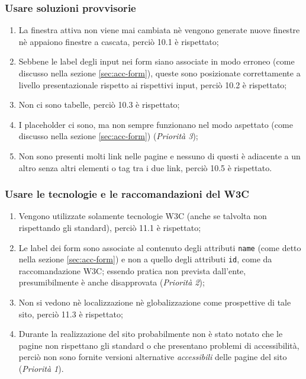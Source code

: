 \subsubsection{Usare soluzioni provvisorie}
\begin{enumerate}
\item La finestra attiva non viene mai cambiata nè vengono generate nuove
finestre nè appaiono finestre a cascata, perciò 10.1 è rispettato;
\item Sebbene le label degli input nei form siano associate in modo erroneo
(come discusso nella sezione \ref{sec:acc-form}), queste sono posizionate
correttamente a livello presentazionale rispetto ai rispettivi input, perciò
10.2 è rispettato;
\item Non ci sono tabelle, perciò 10.3 è rispettato;
\item I placeholder ci sono, ma non sempre funzionano nel modo aspettato (come
discusso nella sezione \ref{sec:acc-form}) (\textit{Priorità 3});
\item Non sono presenti molti link nelle pagine e nessuno di questi è
adiacente a un altro senza altri elementi o tag tra i due link, perciò 10.5 è
rispettato.
\end{enumerate}

\subsubsection{Usare le tecnologie e le raccomandazioni del W3C}
\begin{enumerate}
\item Vengono utilizzate solamente tecnologie W3C (anche se talvolta non
rispettando gli standard), perciò 11.1 è rispettato;
\item Le label dei form sono associate al contenuto degli attributi
\texttt{name} (come detto nella sezione \ref{sec:acc-form}) e non a quello
degli attributi \texttt{id}, come da raccomandazione W3C; essendo pratica non
prevista dall'ente, presumibilmente è anche disapprovata
(\textit{Priorità 2});
\item Non si vedono nè localizzazione nè globalizzazione come prospettive di
tale sito, perciò 11.3 è rispettato;
\item Durante la realizzazione del sito probabilmente non è stato notato che
le pagine non rispettano gli standard o che presentano problemi di
accessibilità, perciò non sono fornite versioni alternative
\textit{accessibili} delle pagine del sito (\textit{Priorità 1}).
\end{enumerate}


